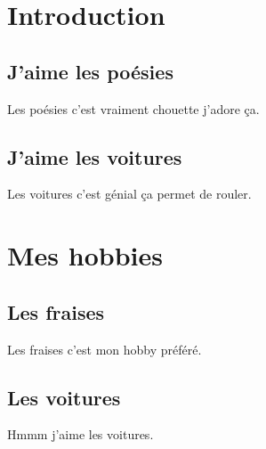 \documentclass{article}
\begin{document}
\maketitle

\section{Introduction}
\subsection{J'aime les poésies}
Les poésies c'est vraiment chouette j'adore ça.

\subsection{J'aime les voitures}
Les voitures c'est génial ça permet de rouler.

\section{Mes hobbies}
\subsection{Les fraises}
Les fraises c'est mon hobby préféré.
\subsection{Les voitures}
Hmmm j'aime les voitures.
\end{document}
